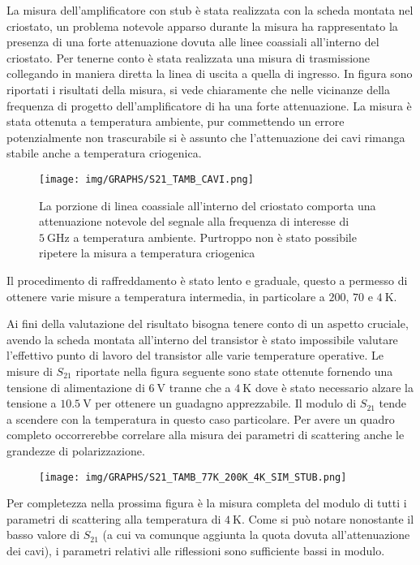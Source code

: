 \documentclass[12pt,oneside]{book}
\begin{document}
La misura dell'amplificatore con stub è stata realizzata con la scheda montata nel criostato, un problema notevole apparso durante la misura ha rappresentato la presenza di una forte attenuazione dovuta alle linee coassiali all'interno del criostato. Per tenerne conto è stata realizzata una misura di trasmissione collegando in maniera diretta la linea di uscita a quella di ingresso. In figura sono riportati i risultati della misura, si vede chiaramente che nelle vicinanze della frequenza di progetto dell'amplificatore di ha una forte attenuazione. La misura è stata ottenuta a temperatura ambiente, pur commettendo un errore potenzialmente non trascurabile si è assunto che l'attenuazione dei cavi rimanga stabile anche a temperatura criogenica. 

\begin{figure}[!htbp]
    \centering
        \texttt{[image: img/GRAPHS/S21\_TAMB\_CAVI.png]}
    \caption{La porzione di linea coassiale all'interno del criostato comporta una attenuazione notevole del segnale alla frequenza di interesse di $\SI{5}{\giga\hertz}$ a temperatura ambiente. Purtroppo non è stato possibile ripetere la misura a temperatura criogenica}
\end{figure}

Il procedimento di raffreddamento è stato lento e graduale, questo a permesso di ottenere varie misure a temperatura intermedia, in particolare a $200$, $70$ e $\SI{4}{\kelvin}$.

Ai fini della valutazione del risultato bisogna tenere conto di un aspetto cruciale, avendo la scheda montata all'interno del transistor è stato impossibile valutare l'effettivo punto di lavoro del transistor alle varie temperature operative. Le misure di $S_{21}$ riportate nella figura seguente sono state ottenute fornendo una tensione di alimentazione di $\SI{6}{\volt}$ tranne che a $\SI{4}{\kelvin}$ dove è stato necessario alzare la tensione a $\SI{10.5}{\volt}$ per ottenere un guadagno apprezzabile.
Il modulo di $S_{21}$ tende a scendere con la temperatura in questo caso particolare. Per avere un quadro completo occorrerebbe correlare alla misura dei parametri di scattering anche le grandezze di polarizzazione.

\begin{figure}[!htbp]
    \centering
        \texttt{[image: img/GRAPHS/S21\_TAMB\_77K\_200K\_4K\_SIM\_STUB.png]}
    \caption{}
\end{figure}

Per completezza nella prossima figura è la misura completa del modulo di tutti i parametri di scattering alla temperatura di $\SI{4}{\kelvin}$. Come si può notare nonostante il basso valore di $S_{21}$ (a cui va comunque aggiunta la quota dovuta all'attenuazione dei cavi), i parametri relativi alle riflessioni sono sufficiente bassi in modulo.
\end{document}
